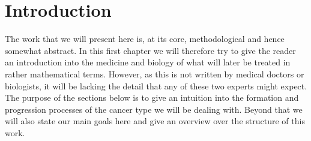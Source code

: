 \documentclass[\relativeRoot/main.tex]{subfiles}
\begin{document}
\chapter{Introduction}
\label{chap:intro}

The work that we will present here is, at its core, methodological and hence somewhat abstract. In this first chapter we will therefore try to give the reader an introduction into the medicine and biology of what will later be treated in rather mathematical terms. However, as this is not written by medical doctors or biologists, it will be lacking the detail that any of these two experts might expect. The purpose of the sections below is to give an intuition into the formation and progression processes of the cancer type we will be dealing with. Beyond that we will also state our main goals here and give an overview over the structure of this work.







\end{document}
